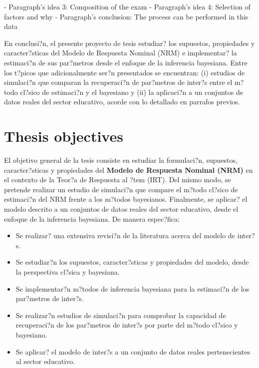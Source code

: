 - Paragraph's idea 3: Composition of the exam
- Paragraph's idea 4: Selection of factors and why
- Paragraph's conclusion: The process can be performed in this data

En conclusi?n, el presente proyecto de tesis estudiar? los supuestos, propiedades y caracter?sticas del Modelo de Respuesta Nominal (NRM) e implementar? la estimaci?n de sus par?metros desde el enfoque de la  inferencia bayesiana. Entre los t?picos que adicionalmente ser?n presentados se encuentran: (i) estudios de simulaci?n que comparan la recuperaci?n de par?metros de inter?s entre el m?todo cl?sico de estimaci?n y el bayesiano y (ii) la aplicaci?n a un conjuntos de datos reales del sector educativo, acorde con lo detallado en parrafos previos.



\section{Thesis objectives}

El objetivo general de la tesis consiste en estudiar la formulaci?n, supuestos, caracter?sticas y propiedades del \textbf{Modelo de Respuesta Nominal (NRM)} en el contexto de la Teor?a de Respuesta al ?tem (IRT). Del mismo modo, se pretende realizar un estudio de simulaci?n que compare el m?todo cl?sico de estimaci?n del NRM frente a los m?todos bayesianos. Finalmente, se aplicar? el modelo descrito a un conjuntos de datos reales del sector educativo, desde el enfoque de la inferencia bayesiana. De manera espec?fica:

\begin{itemize}
\item Se realizar? una extensiva revisi?n de la literatura acerca del modelo de inter?s.
\item Se estudiar?n los supuestos, caracter?sticas y propiedades del modelo, desde la perspectiva cl?sica y bayesiana.
\item Se implementar?n m?todos de inferencia bayesiana para la estimaci?n de los par?metros de inter?s.
\item Se realizar?n estudios de simulaci?n para comprobar la capacidad de recuperaci?n de los par?metros de inter?s por parte del m?todo cl?sico y bayesiano.
\item Se aplicar? el modelo de inter?s a un conjunto de datos reales pertenecientes al sector educativo.
\end{itemize}





